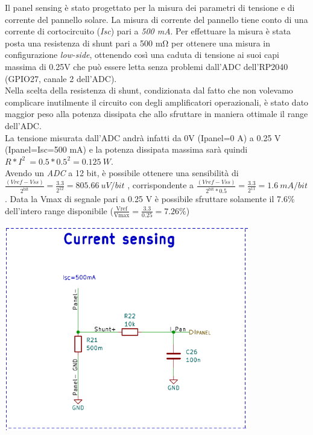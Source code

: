 \noindent Il panel sensing è stato progettato per la misura dei parametri di
tensione e di corrente del pannello solare. La misura di corrente del
pannello tiene conto di una corrente di cortocircuito (\emph{Isc}) pari
a \emph{500 mA}. Per effettuare la misura è stata posta una resistenza
di shunt pari a 500 mΩ per ottenere una misura in configurazione \emph{low-side},
ottenendo così una caduta di tensione ai suoi capi massima di 0.25V che
può essere letta senza problemi dall'ADC dell'RP2040 (GPIO27, canale 2
dell'ADC).\\
Nella scelta della resistenza di shunt, condizionata dal fatto che non
volevamo complicare inutilmente il circuito con degli amplificatori
operazionali, è stato dato maggior peso alla potenza dissipata che allo
sfruttare in maniera ottimale il range dell'ADC.\\
La tensione misurata dall'ADC andrà infatti da 0V (Ipanel=0 A) a 0.25 V
(Ipanel=Isc=500 mA) e la potenza dissipata massima sarà quindi
\(R*I^{2}\  = 0.5*0.5^{2} = 0.125\ W\).\\
Avendo un \emph{ADC} a 12 bit, è possibile ottenere una sensibilità di
\(\frac{(Vref - Vss)}{2^{\text{bit}}} = \frac{3.3}{2^{12}} = 805.66\ uV/bit\)
, corrispondente a
\(\frac{(Vref - Vss)}{2^{\text{bit}}*0.5} = \frac{3.3}{2^{11}} = 1.6\ mA/bit\).
Data la Vmax di segnale pari a 0.25 V è possibile sfruttare solamente il
7.6\% dell'intero range disponibile
(\(\frac{\text{Vref}}{\text{Vmax}} = \frac{3.3}{0.25} = 7.26\%\))

\begin{center}
\includegraphics[width=4.19954in,height=3.53646in]{figures/image19.png}
\captionsetup{type=figure}
\end{center}

